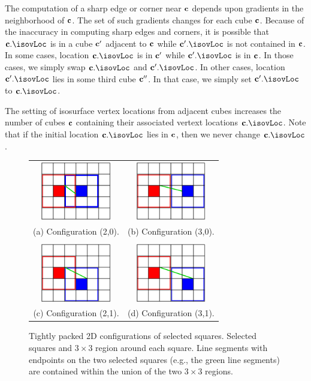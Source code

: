 The computation of a sharp edge or corner near $\mathbf{c}$ depends
upon gradients in the neighborhood of $\mathbf{c}$.
The set of such gradients changes for each cube $\mathbf{c}$.
Because of the inaccuracy in computing sharp edges and corners,
it is possible that $\cb.\isovLoc$ is in a cube $\mathbf{c}'$ adjacent to $\mathbf{c}$
while $\cb'.\isovLoc$ is not contained in $\mathbf{c}$.
In some cases,
location $\cb.\isovLoc$ is in $\mathbf{c}'$ while $\cb'.\isovLoc$ is in $\mathbf{c}$.
In those cases,
we simply swap $\cb.\isovLoc$ and $\cb'.\isovLoc$.
In other cases, location $\cb'.\isovLoc$ lies in some third cube $\mathbf{c}''$.
In that case, we simply set $\cb'.\isovLoc$ to $\cb.\isovLoc$.

The setting of isosurface vertex locations from adjacent cubes
increases the number of cubes $\mathbf{c}$ containing 
their associated vertext locations $\cb.\isovLoc$.
Note that if the initial location $\cb.\isovLoc$ lies in $\mathbf{c}$,
then we never change $\cb.\isovLoc$.


\begin{figure}
\centering
\begin{tabular}{cc}
\includegraphics[width=1.2in]{images/config2D_2_0.eps} \qquad &
\qquad
\includegraphics[width=1.2in]{images/config2D_3_0.eps} \\
(a) Configuration (2,0). & (b) Configuration (3,0). \\
\\
\includegraphics[width=1.2in]{images/config2D_2_1.eps}
\qquad &
\qquad
\includegraphics[width=1.2in]{images/config2D_3_1.eps} \\
(c) Configuration (2,1). & (d) Configuration (3,1).
\end{tabular}
\caption{Tightly packed 2D configurations of selected squares.
Selected squares and $3 \times 3$ region around each square.
Line segments with endpoints on the two selected squares 
(e.g., the green line segments) are contained
within the union of the two $3 \times 3$ regions.}
\label{fig:packed2D}
\end{figure}

